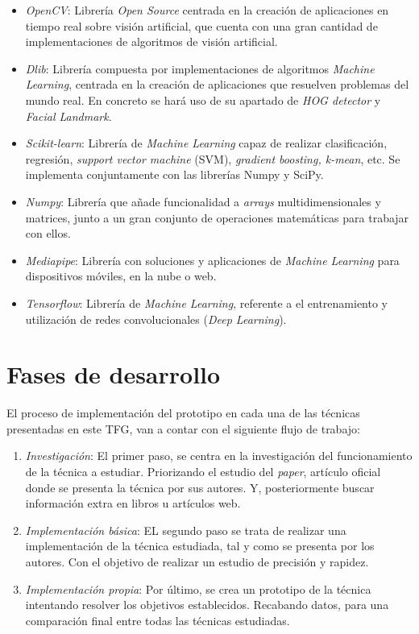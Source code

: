 \begin{itemize}
	\item \textit{OpenCV}: Librería \textit{Open Source} centrada en la creación de aplicaciones en tiempo real sobre visión artificial, que cuenta con una gran cantidad de implementaciones de algoritmos de visión artificial.
	\item \textit{Dlib}: Librería compuesta por implementaciones de algoritmos \textit{Machine Learning}, centrada en la creación de aplicaciones que resuelven problemas del mundo real. En concreto se hará uso de su apartado de \textit{HOG detector} y \textit{Facial Landmark}.
	\item \textit{Scikit-learn}: Librería de \textit{Machine Learning} capaz de realizar clasificación, regresión, \textit{support vector machine} (SVM), \textit{gradient boosting, \textit{k-mean}}, etc. Se implementa conjuntamente con las librerías Numpy y SciPy.
	\item \textit{Numpy}: Librería que añade funcionalidad a \textit{arrays} multidimensionales y matrices, junto a un gran conjunto de operaciones matemáticas para trabajar con ellos.
	\item \textit{Mediapipe}: Librería con soluciones y aplicaciones de \textit{Machine Learning} para dispositivos móviles, en la nube o web.
	\item \textit{Tensorflow}: Librería de \textit{Machine Learning}, referente a el entrenamiento y utilización de redes convolucionales (\textit{Deep Learning}).
\end{itemize}

\vspace{-0.5cm}
\section*{Fases de desarrollo}

El proceso de implementación del prototipo en cada una de las técnicas presentadas en este TFG, van a contar con el siguiente flujo de trabajo:

\begin{enumerate}
	\item \textit{Investigación}: El primer paso, se centra en la investigación del funcionamiento de la técnica a estudiar. Priorizando el estudio del \textit{paper}, artículo oficial donde se presenta la técnica por sus autores. Y, posteriormente buscar información extra en libros u artículos web.
	\item \textit{Implementación básica}: EL segundo paso se trata de realizar una implementación de la técnica estudiada, tal y como se presenta por los autores. Con el objetivo de realizar un estudio de precisión y rapidez.
	\item \textit{Implementación propia}: Por último, se crea un prototipo de la técnica intentando resolver los objetivos establecidos. Recabando datos, para una comparación final entre todas las técnicas estudiadas.
\end{enumerate}

